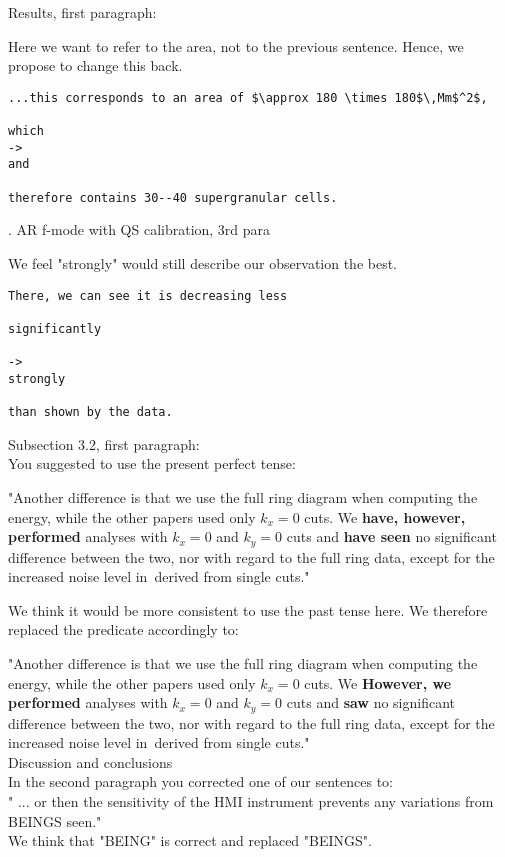 \documentclass[a4]{article}
\begin{document}
\noindent Results, first paragraph:

\noindent Here we want to refer to the area, not to the previous sentence. Hence, we propose to change this back.
\begin{verbatim}
...this corresponds to an area of $\approx 180 \times 180$\,Mm$^2$, 

which 
->
and 

therefore contains 30--40 supergranular cells.
\end{verbatim}

. AR f-mode with QS calibration, 3rd para

\noindent We feel "strongly" would still describe our observation the best.

\begin{verbatim}
There, we can see it is decreasing less 

significantly

->
strongly 

than shown by the data.
\end{verbatim}

\noindent Subsection 3.2, first paragraph:\\
You suggested to use the present perfect tense:

"Another difference is that we use the
full ring diagram when computing the \fff energy, while the
other papers used only $k_x=0$ cuts. We 
\textbf{have, however, performed}
analyses with $k_x=0$ and $k_y=0$ cuts and 
\textbf{have seen} 
no significant
difference between the two, nor with regard to the full ring data, except for the
increased noise level in \ef\,derived from single cuts."

\noindent We think it would be more consistent to use the past tense here. We therefore replaced the predicate accordingly to:

"Another difference is that we use the
full ring diagram when computing the \fff energy, while the
other papers used only $k_x=0$ cuts. We 
\textbf{However, we performed}
analyses with $k_x=0$ and $k_y=0$ cuts and 
\textbf{saw} 
no significant
difference between the two, nor with regard to the full ring data, except for the
increased noise level in \ef\,derived from single cuts."\\

 Discussion and conclusions\\
\noindent In the second paragraph you corrected one of our sentences to:\\
\noindent " ... or then the sensitivity of the HMI instrument prevents  any variations from BEINGS seen."\\
\noindent We think that "BEING" is correct and replaced "BEINGS".
\end{document}
